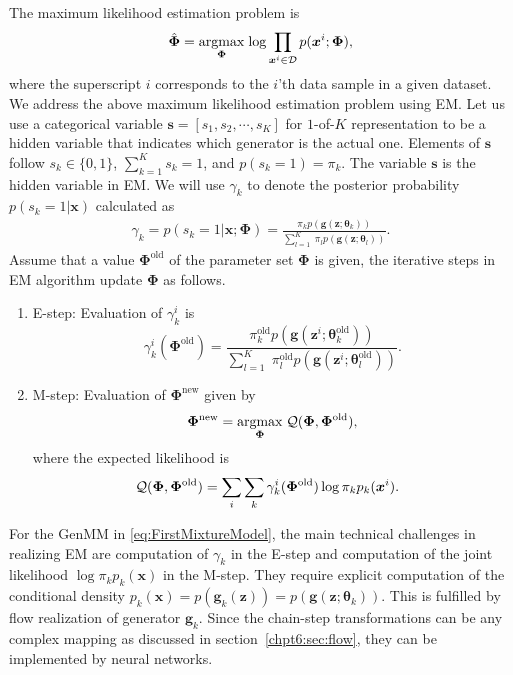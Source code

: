 The maximum likelihood estimation problem is
\begin{equation}\label{eq:max-genmm}
  \hat{\bm{\Phi}} = \underset{\bm{\Phi}}{\operatorname{argmax}}\;{\log{\prod_{\bm{x}^{i} \in \mathcal{D}} p(\bm{x}^{i};\bm{\Phi})}},
\end{equation}
where the superscript $i$ corresponds to the $i$'th data sample in a given dataset.
We address the above maximum likelihood estimation problem using EM. 
Let us use a categorical variable $\bm{s} = [s_1, s_2, \cdots, s_K]$
for $1$-of-$K$ representation to be a hidden variable that indicates which generator is the actual one. Elements of $\bm{s}$ follow $s_k \in \{0,1\}$, $\sum_{k=1}^K s_k =1$, and $p(s_k=1)=\pi_k$. The variable $\bm{s}$ is the hidden variable in EM. We will use $\gamma_k$ to denote the posterior probability $p(s_k =1|\bm{x})$ calculated as
\begin{align}\label{eq-genmm-gamma}
  \gamma_k = p(s_k =1|\bm{x};\bm{\Phi}) 
  = \frac{\pi_k p(\bm{g}(\bm{z};\bm{\theta}_k))}{\sum_{l=1}^K\; \pi_l p(\bm{g}(\bm{z};\bm{\theta}_l))}.
\end{align}
Assume that a value $\bm{\Phi}^{\mathrm{old}}$ of the parameter set $\bm{\Phi}$ is given, the iterative steps in EM algorithm update $\bm{\Phi}$ as follows.
\begin{enumerate}
\item E-step: Evaluation of $\gamma_{k}^{i}$ is 
  \begin{equation}\label{eq-genmm-e-step}
    \gamma_{k}^{i}(\bm{\Phi}^{\mathrm{old}}) = \frac{\pi_k^\mathrm{{old}} p(\bm{g}(\bm{z}^{i};\bm{\theta}_k^{\mathrm{old}}))}{\sum_{l=1}^K\; \pi_l^\mathrm{{old}} p(\bm{g}(\bm{z}^{i};\bm{\theta}_l^{\mathrm{old}}))}.   
  \end{equation}
\item M-step: Evaluation of $\bm{\Phi}^{\mathrm{new}}$ given by
  \begin{equation}\label{eq-genmm-opt}
    \bm{\Phi}^{\mathrm{new}} =   \underset{\bm{\Phi}}{\operatorname{argmax}}\;{\mathcal{Q} (\bm{\Phi},\bm{\Phi}^{\mathrm{old}})}, 
  \end{equation}
  where the expected likelihood is
  \begin{equation}
    \hspace{-8pt}\mathcal{Q} (\bm{\Phi},\bm{\Phi}^{\mathrm{old}}) = \sum_{i}\sum_{k} \gamma_{k}^{i}(\bm{\Phi}^{\mathrm{old}}) \log \pi_k p_k(\bm{x}^{i}).
  \end{equation}
\end{enumerate}

For the GenMM in \eqref{eq:FirstMixtureModel}, the main technical challenges in realizing EM are computation of $\gamma_k$ in the E-step and computation of the joint likelihood $\log{\pi_k p_k(\bm{x})}$ in the M-step. They require explicit computation of the conditional density $p_k(\bm{x}) =  p(\bm{g}_k(\bm{z})) =p(\bm{g}(\bm{z};\bm{\theta}_k))$. This is fulfilled by flow realization of generator $\bm{g}_k$. Since the chain-step transformations can be any complex mapping as discussed in section~\ref{chpt6:sec:flow}, they can be implemented by neural networks.

